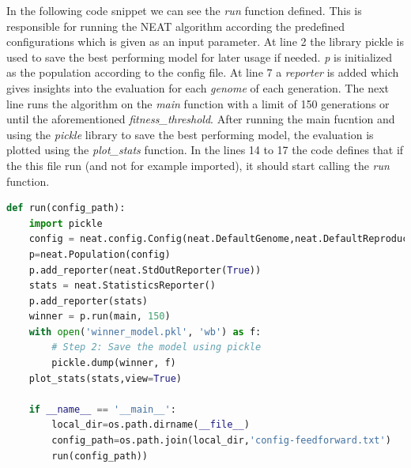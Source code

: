 \documentclass[conference]{IEEEtran}
\begin{document}
In the following code snippet we can see the \textit{run} function defined. This is responsible for running the NEAT algorithm according the predefined configurations which is given as an input parameter.  At line 2 the library pickle is used to save the best performing model for later usage if needed. \textit{p} is initialized as the population according to the config file. At line 7 a \textit{reporter} is added which gives insights into the evaluation for each \textit{genome} of each generation. The next line runs the algorithm on the \textit{main} function with a limit of 150 generations or until the aforementioned \textit{fitness\_threshold}. After running the main fucntion and using the \textit{pickle} library to save the best performing model, the evaluation is plotted using the \textit{plot\_stats} function. In the lines 14 to 17 the code defines that if the this file run (and not for example imported), it should start calling the \textit{run} function.
\begin{lstlisting}[language=Python, caption=Run function]
def run(config_path):
	import pickle
	config = neat.config.Config(neat.DefaultGenome,neat.DefaultReproduction,neat.DefaultSpeciesSet,neat.DefaultStagnation,config_path)
	p=neat.Population(config)
	p.add_reporter(neat.StdOutReporter(True))
	stats = neat.StatisticsReporter()
	p.add_reporter(stats)
	winner = p.run(main, 150)
	with open('winner_model.pkl', 'wb') as f:
		# Step 2: Save the model using pickle
		pickle.dump(winner, f)
	plot_stats(stats,view=True)
	
	if __name__ == '__main__':
		local_dir=os.path.dirname(__file__)
		config_path=os.path.join(local_dir,'config-feedforward.txt')
		run(config_path))\end{lstlisting}
\end{document}
